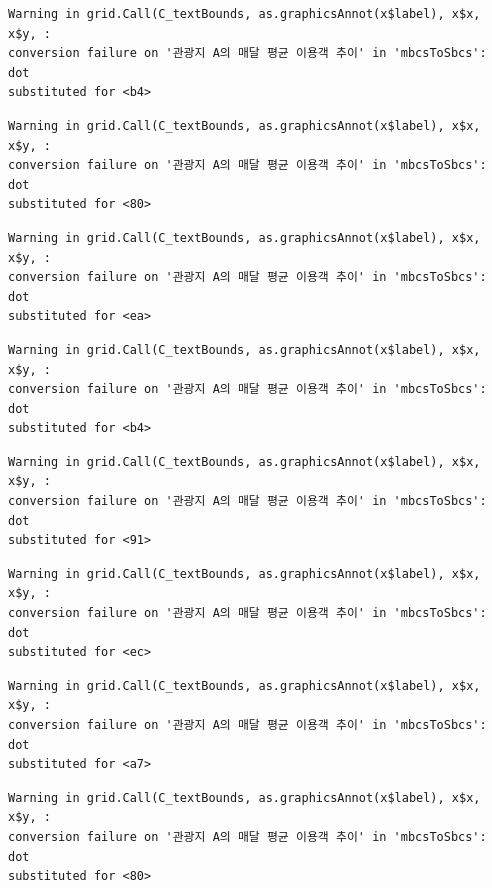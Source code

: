 \documentclass[
  letterpaper,
  DIV=11,
  numbers=noendperiod]{scrreprt}
\begin{document}
\begin{verbatim}
Warning in grid.Call(C_textBounds, as.graphicsAnnot(x$label), x$x, x$y, :
conversion failure on '관광지 A의 매달 평균 이용객 추이' in 'mbcsToSbcs': dot
substituted for <b4>
\end{verbatim}

\begin{verbatim}
Warning in grid.Call(C_textBounds, as.graphicsAnnot(x$label), x$x, x$y, :
conversion failure on '관광지 A의 매달 평균 이용객 추이' in 'mbcsToSbcs': dot
substituted for <80>
\end{verbatim}

\begin{verbatim}
Warning in grid.Call(C_textBounds, as.graphicsAnnot(x$label), x$x, x$y, :
conversion failure on '관광지 A의 매달 평균 이용객 추이' in 'mbcsToSbcs': dot
substituted for <ea>
\end{verbatim}

\begin{verbatim}
Warning in grid.Call(C_textBounds, as.graphicsAnnot(x$label), x$x, x$y, :
conversion failure on '관광지 A의 매달 평균 이용객 추이' in 'mbcsToSbcs': dot
substituted for <b4>
\end{verbatim}

\begin{verbatim}
Warning in grid.Call(C_textBounds, as.graphicsAnnot(x$label), x$x, x$y, :
conversion failure on '관광지 A의 매달 평균 이용객 추이' in 'mbcsToSbcs': dot
substituted for <91>
\end{verbatim}

\begin{verbatim}
Warning in grid.Call(C_textBounds, as.graphicsAnnot(x$label), x$x, x$y, :
conversion failure on '관광지 A의 매달 평균 이용객 추이' in 'mbcsToSbcs': dot
substituted for <ec>
\end{verbatim}

\begin{verbatim}
Warning in grid.Call(C_textBounds, as.graphicsAnnot(x$label), x$x, x$y, :
conversion failure on '관광지 A의 매달 평균 이용객 추이' in 'mbcsToSbcs': dot
substituted for <a7>
\end{verbatim}

\begin{verbatim}
Warning in grid.Call(C_textBounds, as.graphicsAnnot(x$label), x$x, x$y, :
conversion failure on '관광지 A의 매달 평균 이용객 추이' in 'mbcsToSbcs': dot
substituted for <80>
\end{verbatim}
\end{document}
